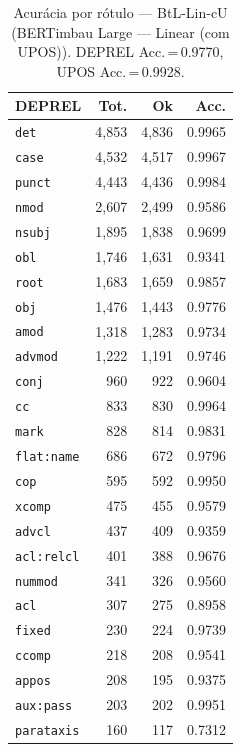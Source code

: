 \begin{table}[ht]
\centering
\caption{Acurácia por rótulo --- BtL-Lin-cU (BERTimbau Large — Linear (com UPOS)). DEPREL Acc.\,=\,0.9770, UPOS Acc.\,=\,0.9928.}
\label{tab:acc-predict-test-df-bertimbau-large-linear}
\begin{minipage}[t]{0.55\linewidth}
\centering\scriptsize
\begin{tabular}{lrrr}
\toprule
\textbf{DEPREL} & \textbf{Tot.} & \textbf{Ok} & \textbf{Acc.} \\
\midrule
\texttt{det} & 4,853 & 4,836 & 0.9965 \\
\texttt{case} & 4,532 & 4,517 & 0.9967 \\
\texttt{punct} & 4,443 & 4,436 & 0.9984 \\
\texttt{nmod} & 2,607 & 2,499 & 0.9586 \\
\texttt{nsubj} & 1,895 & 1,838 & 0.9699 \\
\texttt{obl} & 1,746 & 1,631 & 0.9341 \\
\texttt{root} & 1,683 & 1,659 & 0.9857 \\
\texttt{obj} & 1,476 & 1,443 & 0.9776 \\
\texttt{amod} & 1,318 & 1,283 & 0.9734 \\
\texttt{advmod} & 1,222 & 1,191 & 0.9746 \\
\texttt{conj} & 960 & 922 & 0.9604 \\
\texttt{cc} & 833 & 830 & 0.9964 \\
\texttt{mark} & 828 & 814 & 0.9831 \\
\texttt{flat\!:\!name} & 686 & 672 & 0.9796 \\
\texttt{cop} & 595 & 592 & 0.9950 \\
\texttt{xcomp} & 475 & 455 & 0.9579 \\
\texttt{advcl} & 437 & 409 & 0.9359 \\
\texttt{acl\!:\!relcl} & 401 & 388 & 0.9676 \\
\texttt{nummod} & 341 & 326 & 0.9560 \\
\texttt{acl} & 307 & 275 & 0.8958 \\
\texttt{fixed} & 230 & 224 & 0.9739 \\
\texttt{ccomp} & 218 & 208 & 0.9541 \\
\texttt{appos} & 208 & 195 & 0.9375 \\
\texttt{aux\!:\!pass} & 203 & 202 & 0.9951 \\
\texttt{parataxis} & 160 & 117 & 0.7312 \\

\end{tabular}
\end{minipage}
\end{table}
